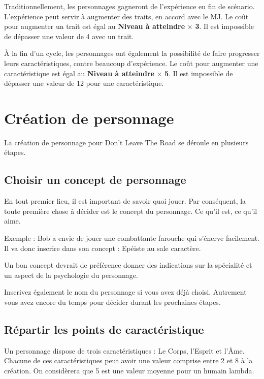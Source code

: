 \documentclass[a4paper,10pt,twoside,twocolumn,openany,bg=print,justified]{dndbook}
\begin{document}
Traditionnellement, les personnages gagneront de l'expérience en fin de scénario. L'expérience peut servir à augmenter des traits, en accord avec le MJ. Le coût pour augmenter un trait est égal au \textbf{Niveau à atteindre} $\times$ \textbf{3}. Il est impossible de dépasser une valeur de 4 avec un trait.

À la fin d'un cycle, les personnages ont également la possibilité de faire progresser leurs caractéristiques, contre beaucoup d'expérience. Le coût pour augmenter une caractéristique est égal au \textbf{Niveau à atteindre} $\times$ \textbf{5}. Il est impossible de dépasser une valeur de 12 pour une caractéristique.

\chapter{Création de personnage}

La création de personnage pour Don't Leave The Road se déroule en plusieurs étapes.

\section{Choisir un concept de personnage}

En tout premier lieu, il est important de savoir quoi jouer. Par conséquent, la toute première chose à décider est le concept du personnage. Ce qu'il est, ce qu'il aime.

\begin{quotebox}
Exemple : Bob a envie de jouer une combattante farouche qui s'énerve facilement. Il va donc inscrire dans son concept : Epéiste au sale caractère.
\end{quotebox}

Un bon concept devrait de préférence donner des indications sur la spécialité et un aspect de la psychologie du personnage.

Inscrivez également le nom du personnage si vous avez déjà choisi. Autrement vous avez encore du temps pour décider durant les prochaines étapes.

\section{Répartir les points de caractéristique}

Un personnage dispose de trois caractéristiques : Le Corps, l'Esprit et l'Âme. Chacune de ces caractéristiques peut avoir une valeur comprise entre 2 et 8 à la création. On considèrera que 5 est une valeur moyenne pour un humain lambda.
\end{document}
